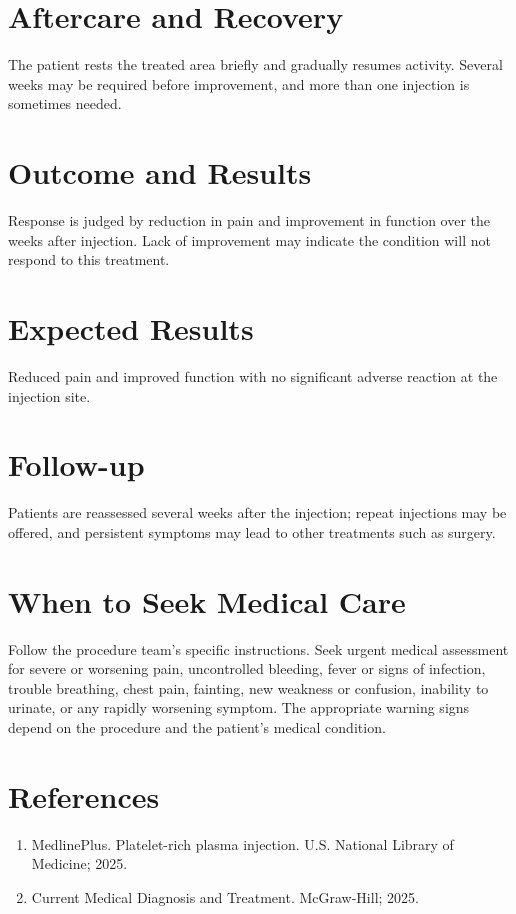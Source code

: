 \section*{Aftercare and Recovery}
The patient rests the treated area briefly and gradually resumes activity. Several weeks may be required before improvement, and more than one injection is sometimes needed.
\section*{Outcome and Results}
Response is judged by reduction in pain and improvement in function over the weeks after injection. Lack of improvement may indicate the condition will not respond to this treatment.
\section*{Expected Results}
Reduced pain and improved function with no significant adverse reaction at the injection site.
\section*{Follow-up}
Patients are reassessed several weeks after the injection; repeat injections may be offered, and persistent symptoms may lead to other treatments such as surgery.
\section*{When to Seek Medical Care}
Follow the procedure team's specific instructions. Seek urgent medical assessment for severe or worsening pain, uncontrolled bleeding, fever or signs of infection, trouble breathing, chest pain, fainting, new weakness or confusion, inability to urinate, or any rapidly worsening symptom. The appropriate warning signs depend on the procedure and the patient's medical condition.

\section*{References}
\begin{enumerate}
  \item MedlinePlus. Platelet-rich plasma injection. U.S. National Library of Medicine; 2025.
  \item Current Medical Diagnosis and Treatment. McGraw-Hill; 2025.
\end{enumerate}

\clearpage
